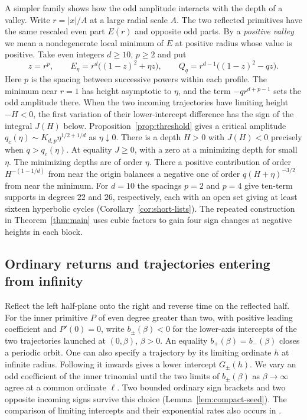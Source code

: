 A simpler family shows how the odd amplitude interacts with the depth
of a valley. Write $r=|x|/A$ at a large radial scale $A$. The two
reflected primitives have the same rescaled even part $E(r)$ and
opposite odd parts. By a \emph{positive valley} we mean a nondegenerate
local minimum of $E$ at positive radius whose value is positive. Take
even integers $d\ge10$, $p\ge2$ and put
\[
 z=r^p,\qquad E_\eta=r^d\bigl((1-z)^2+\eta z\bigr),\qquad
 Q_q=r^{d-1}\bigl((1-z)^2-qz\bigr).
\]
Here $p$ is the spacing between successive powers within each profile.
The minimum near $r=1$ has height asymptotic to $\eta$, and the term
$-q r^{d+p-1}$ sets the odd amplitude there. When the two incoming trajectories have limiting
height $-H<0$, the first variation of their lower-intercept difference
has the sign of the integral $J(H)$ below.
Proposition~\ref{prop:threshold} gives a critical amplitude
$q_c(\eta)\sim K_{d,p}\eta^{1/2+1/d}$ as $\eta\downarrow0$.
There is a depth $H>0$ with $J(H)<0$ precisely when $q>q_c(\eta)$.
At equality $J\ge0$, with a zero at a minimizing depth for small $\eta$.
The minimizing depths are of order $\eta$. There a positive contribution
of order $H^{-(1-1/d)}$ from near the origin balances a negative one
of order $q(H+\eta)^{-3/2}$ from near the minimum. For $d=10$ the
spacings $p=2$ and $p=4$ give ten-term supports in degrees $22$ and
$26$, respectively, each with an open set giving at least sixteen
hyperbolic cycles (Corollary~\ref{cor:short-lists}).
The repeated construction in Theorem~\ref{thm:main} uses cubic
factors to gain four sign changes at negative heights in each block.

\subsection{Ordinary returns and trajectories entering from infinity}
Reflect the left half-plane onto the right and reverse time on the
reflected half. For the inner primitive $P$ of even degree greater than
two, with positive leading coefficient and $P'(0)=0$, write
$b_\pm(\beta)<0$ for the lower-axis intercepts of the two trajectories
launched at $(0,\beta)$, $\beta>0$. An equality $b_+(\beta)=b_-(\beta)$
closes a periodic orbit. One can also specify a trajectory by its
limiting ordinate $h$ at infinite radius. Following it inwards gives a
lower intercept $G_\pm(h)$. We vary an odd coefficient of the inner
trinomial until the two limits of $b_\pm(\beta)$ as $\beta\to\infty$
agree at a common ordinate $\ell$. Two bounded ordinary sign brackets
and two opposite incoming signs survive this choice
(Lemma~\ref{lem:compact-seed}). The comparison of limiting intercepts
and their exponential rates also occurs in
\cite[Proposition~2.2 and (3.17)--(3.19)]{CJLZ}.

